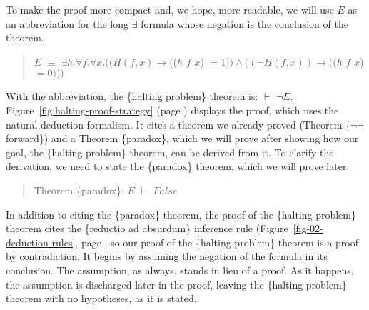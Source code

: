 To make the proof more compact and, we hope, more readable,
we will use $E$ as an abbreviation for the
long $\exists$ formula whose negation is the conclusion of the theorem.
\begin{quote}
$E$ $\equiv$ $\exists h. \forall f. \forall x.
((H(f, x) \rightarrow ($($h$ $f$ $x$) $ = 1)) \wedge ((\neg H(f, x)) \rightarrow ($($h$ $f$ $x$) $= 0)))$
\end{quote}

With the abbreviation, the \{halting problem\} theorem is: $\vdash$ $\neg E$.
Figure~\ref{fig:halting-proof-strategy} (page \pageref{fig:halting-proof-strategy})
displays the proof, which uses the natural deduction formalism.
It cites a theorem we already proved (Theorem \{$\neg \neg$ forward\}) and
a Theorem \{paradox\}, which we will prove
after showing how our goal, the \{halting problem\} theorem,
can be derived from it.
To clarify the derivation, we need to state the \{paradox\} theorem,
which we will prove later.
\begin{quote}
Theorem \{paradox\}: $E$ $\vdash$ $False$
\end{quote}

In addition to citing the \{paradox\} theorem,
the proof of the \{halting problem\} theorem
cites the \{reductio ad absurdum\} inference rule
(Figure~\ref{fig-02-deduction-rules}, page \pageref{fig-02-deduction-rules},
so our proof of the \{halting problem\} theorem is a proof by contradiction.
It begins by assuming the negation of the formula in its conclusion.
The assumption, as always, stands in lieu of a proof.
As it happens, the assumption is discharged later in the proof,
leaving the \{halting problem\} theorem with no hypotheses,
as it is stated.

